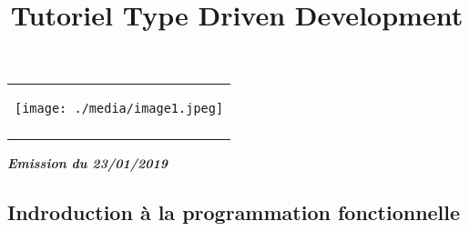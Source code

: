 \documentclass[12pt]{article}
\title{Tutoriel Type Driven Development }
\date{}
\begin{document}
\maketitle
\par


\vspace{\baselineskip}

\vspace{\baselineskip}




\begin{table}[H]
 			\centering
\begin{tabular}{p{6.1in}}
\multicolumn{1}{p{6.1in}}{
	\begin{Center}
		\texttt{[image: ./media/image1.jpeg]}
	\end{Center}
 \par } \\
\hhline{~}

\end{tabular}
 \end{table}



\begin{Center}
{\fontsize{14pt}{16.8pt}\selectfont \textbf{\textit{Emission du 23/01/2019}}\par}
\end{Center}\par

\par 

\vspace{\baselineskip}

\vspace{\baselineskip}



\newpage

\vspace{\baselineskip}\setlength{\parskip}{6.0pt}
\begin{adjustwidth}{0.25in}{0.0in}
\section*{Indroduction à la programmation fonctionnelle}
\end{adjustwidth}
\end{document}
